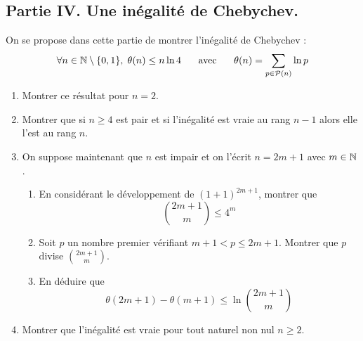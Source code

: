 \subsection*{Partie IV. Une inégalité de Chebychev.}
On se propose dans cette partie de montrer l'inégalité de Chebychev :
\begin{displaymath}
 \forall n \in \mathbb{N}\setminus\{0,1\}, \; \theta (n) \leq n \ln 4\hspace{0.5cm}\text{ avec }\hspace{0.5cm} \theta (n) = \sum_{p\in \mathcal P(n)} \ln p
\end{displaymath}
\begin{enumerate}
\item Montrer ce résultat pour $n = 2$.

\item Montrer que si $n \geq 4$ est pair et si l'inégalité est vraie au rang $n-1$ alors
elle l'est au rang $n$.

\item On suppose maintenant que $n$ est impair et on l'écrit $n = 2m + 1$ avec $m \in \mathbb{N}$.
\begin{enumerate}
\item En considérant le développement de $ (1 + 1)^{2m + 1}$, montrer que 
\begin{displaymath}
\binom{2m + 1}{m} \leq 4^m 
\end{displaymath}

\item Soit $p$ un nombre premier vérifiant $m+1  < p \leq 2m + 1$.\newline
 Montrer que $p$ divise $\binom{2m + 1}{m}$.
\item En déduire que
\begin{displaymath}
 \theta (2m + 1) - \theta (m+1) \leq \ln \binom{2m + 1}{m}
\end{displaymath}
 \end{enumerate}

\item Montrer que l'inégalité est vraie pour tout naturel non nul $n\geq 2$.

\end{enumerate}


